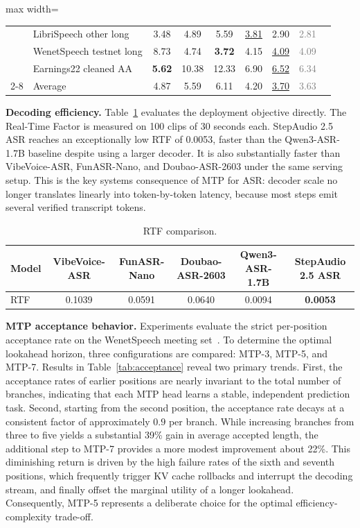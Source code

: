\begin{table}[tbp]
\begin{adjustbox}{max width=\textwidth}
\begin{tabular}{llcccccc>{\color{gray}\arraybackslash}c}
& LibriSpeech other long & 3.48 & 4.89 & 5.59 & \underline{3.81} & 2.90 & \textcolor{gray}{2.81} \\
& WenetSpeech testnet long & 8.73 & 4.74 & \textbf{3.72} & 4.15 & \underline{4.09} & \textcolor{gray}{4.09} \\
& Earnings22 cleaned AA & \textbf{5.62} & 10.38 & 12.33 & 6.90 & \underline{6.52} & \textcolor{gray}{6.34} \\
\cmidrule(lr){2-8}
& Average & 4.87 & 5.59 & 6.11 & 4.20 & \underline{3.70} & \textcolor{gray}{3.63} \\
\bottomrule
\end{tabular}
\end{adjustbox}
\end{table}

\textbf{Decoding efficiency.} Table~\ref{tab:rtf} evaluates the deployment objective directly. The Real-Time Factor is measured on 100 clips of 30 seconds each. StepAudio 2.5 ASR reaches an exceptionally low RTF of 0.0053, faster than the Qwen3-ASR-1.7B baseline despite using a larger decoder. It is also substantially faster than VibeVoice-ASR, FunASR-Nano, and Doubao-ASR-2603 under the same serving setup. This is the key systems consequence of MTP for ASR: decoder scale no longer translates linearly into token-by-token latency, because most steps emit several verified transcript tokens.

\begin{table}[htb]
\centering
\small
\caption{RTF comparison.}
\label{tab:rtf}
\begin{tabular}{lccccc}
\toprule
Model & VibeVoice-ASR & FunASR-Nano & Doubao-ASR-2603 & Qwen3-ASR-1.7B & StepAudio 2.5 ASR \\
\midrule
RTF & 0.1039 & 0.0591 & 0.0640 & 0.0094 & \textbf{0.0053} \\
\bottomrule
\end{tabular}
\end{table}

\textbf{MTP acceptance behavior.} Experiments evaluate the strict per-position acceptance rate on the WenetSpeech meeting set~\citep{zhang2022wenetspeech}. To determine the optimal lookahead horizon, three configurations are compared: MTP-3, MTP-5, and MTP-7. Results in Table~\ref{tab:acceptance} reveal two primary trends. First, the acceptance rates of earlier positions are nearly invariant to the total number of branches, indicating that each MTP head learns a stable, independent prediction task. Second, starting from the second position, the acceptance rate decays at a consistent factor of approximately $0.9$ per branch. While increasing branches from three to five yields a substantial 39\% gain in average accepted length, the additional step to MTP-7 provides a more modest improvement about 22\%. This diminishing return is driven by the high failure rates of the sixth and seventh positions, which frequently trigger KV cache rollbacks and interrupt the decoding stream, and finally offset the marginal utility of a longer lookahead. Consequently, MTP-5 represents a deliberate choice for the optimal efficiency-complexity trade-off.

